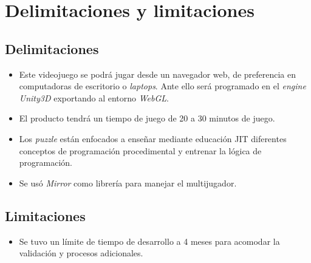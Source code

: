 \section{Delimitaciones y limitaciones}
\subsection{Delimitaciones}
\begin{itemize}
    \item Este videojuego se podrá jugar desde un navegador web, de preferencia en computadoras de escritorio o \textit{laptops}. Ante ello será programado en el \textit{engine} \textit{Unity3D} exportando al entorno \textit{WebGL}.
    \item El producto tendrá un tiempo de juego de 20 a 30 minutos de juego.
    \item Los \textit{puzzle} están enfocados a enseñar mediante educación JIT diferentes conceptos de programación procedimental y entrenar la lógica de programación.
    \item Se usó \textit{Mirror} como librería para manejar el multijugador.
\end{itemize}
\subsection{Limitaciones}
\begin{itemize}
    \item Se tuvo un límite de tiempo de desarrollo a 4 meses para acomodar la validación y
procesos adicionales.

\end{itemize}
